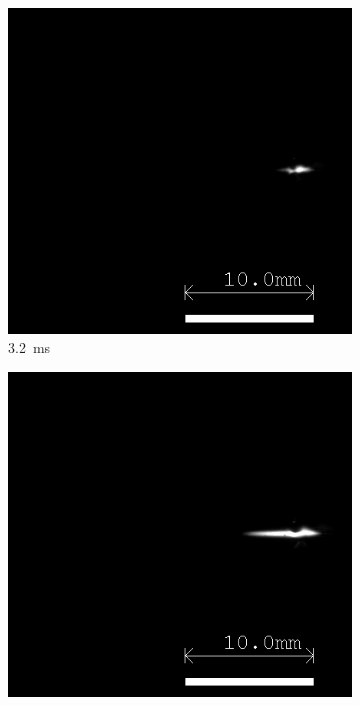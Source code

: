 \begin{figure}[!ht]
    \centering
    \begin{subfigure}[t]{0.3\textwidth}
        \centering
        \includegraphics[width=\textwidth]{assets/4 experiments/V1 Spark Ignition Frames/LSP142_SPRK15_Fr32.png}
        \caption{\qty{3.2}{ms}}
    \end{subfigure}
    \hfill
    \begin{subfigure}[t]{0.3\textwidth}
        \centering
        \includegraphics[width=\textwidth]{assets/4 experiments/V1 Spark Ignition Frames/LSP142_SPRK15_Fr33.png}

\end{subfigure}
\end{figure}
